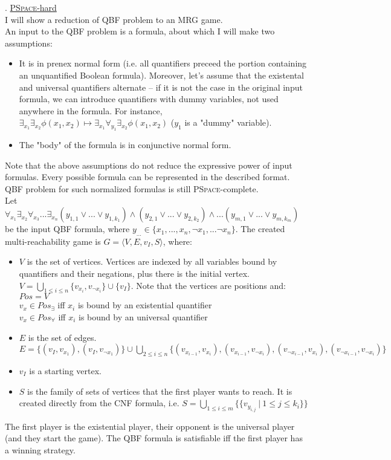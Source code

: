 . \underline{\textsc{PSpace}-hard}\\
I will show a reduction of QBF problem to an MRG game.\\
An input to the QBF problem is a formula, about which I will make two assumptions:
\begin{itemize}
    \item It is in prenex normal form (i.e. all quantifiers preceed the portion
    containing an unquantified Boolean formula). Moreover, let's assume that the
    existental and universal quantifiers alternate -- if it is not the case in the
    original input formula, we can introduce quantifiers with dummy variables, not
    used anywhere in the formula. For instance, $\exists_{x_1} \exists_{x_2}
    \phi(x_1, x_2) \mapsto \exists_{x_1} \forall_{y_1} \exists_{x_2} \phi(x_1, x_2)$
    ($y_1$ is a "dummy" variable).
    \item The "body" of the formula is in conjunctive normal form.
\end{itemize}
Note that the above assumptions do not reduce the expressive power of input formulas.
Every possible formula can be represented in the described format. QBF problem for
such normalized formulas is still \textsc{PSpace}-complete.\\
Let $\forall_{x_1} \exists_{x_2} \forall_{x_3} ... \exists_{x_n}
(y_{1,1} \lor ... \lor y_{1,k_1}) \land (y_{2,1} \lor ... \lor y_{2,k_2}) \land ... (y_{m,1} \lor ... \lor y_{m,k_m})$
be the input QBF formula, where $y_{...} \in \{x_1, ..., x_n, \lnot x_1, ... \lnot x_n \}$.
The created multi-reachability game is $G = \langle V, E, v_I, S \rangle$, where:
\begin{itemize}
    \item $V$ is the set of vertices. Vertices are indexed by all variables bound by
          quantifiers and their negations, plus there is the initial vertex.
          $V = \underset{1 \leq i \leq n}{\bigcup} \{v_{x_i}, v_{\lnot {x_i}}\} \cup \{v_I\}$.
          Note that the vertices are positions and:\\
          $Pos = V$\\
          $v_x \in Pos_{\exists}$ iff $x_i$ is bound by an existential quantifier\\
          $v_x \in Pos_{\forall}$ iff $x_i$ is bound by an universal quantifier
    \item $E$ is the set of edges.
          $E = \{(v_I, v_{x_1}), (v_I, v_{\lnot x_1})\} \cup
          \underset{2 \leq i \leq n}{\bigcup} \{ (v_{x_{i-1}}, v_{x_i}), (v_{x_{i-1}}, v_{\lnot x_i}),
          (v_{\lnot x_{i-1}}, v_{x_i}), (v_{\lnot x_{i-1}}, v_{\lnot x_i}) \}$
    \item $v_I$ is a starting vertex.
    \item $S$ is the family of sets of vertices that the first player wants to reach.
          It is created directly from the CNF formula, i.e.
          $S = \underset{1 \leq i \leq m}{\bigcup} \{ \{ v_{y_{i,j}}\ |\ 1 \leq j \leq k_i \} \}$
\end{itemize}
The first player is the existential player, their opponent is the universal player (and they start the game).
The QBF formula is satisfiable iff the first player has a winning strategy.\\

